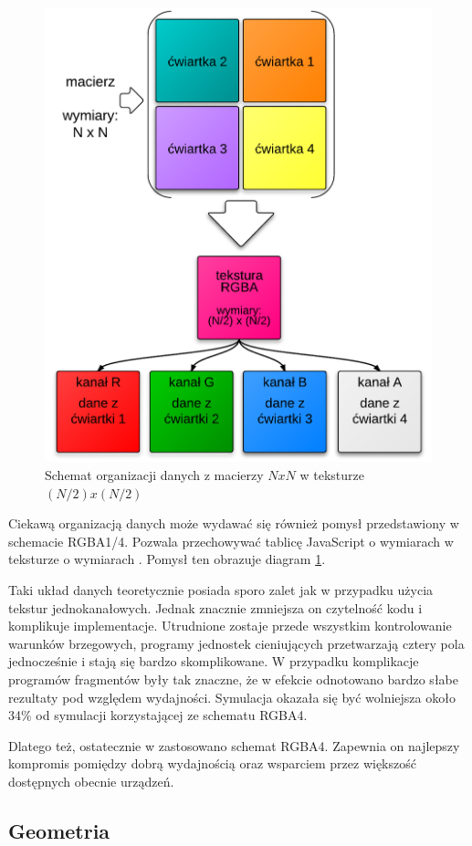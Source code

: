 \begin{figure}[!h]
\centering
\includegraphics[width=.65\textwidth]{img/rgba14Tex}
\caption{Schemat organizacji danych z macierzy $NxN$ w teksturze $(N/2)x(N/2)$}
\label{fig:rgba14Tex}
\end{figure}

Ciekawą organizacją danych może wydawać się również pomysł przedstawiony w
schemacie RGBA1/4. Pozwala przechowywać tablicę JavaScript o wymiarach 
w teksturze o wymiarach . Pomysł ten obrazuje diagram
\ref{fig:rgba14Tex}.

Taki układ danych teoretycznie posiada sporo zalet jak w przypadku użycia
tekstur jednokanałowych. Jednak znacznie zmniejsza on czytelność kodu i
komplikuje implementacje. Utrudnione zostaje przede wszystkim kontrolowanie
warunków brzegowych, programy jednostek cieniujących przetwarzają cztery pola
jednocześnie i stają się bardzo skomplikowane. W przypadku 
komplikacje programów fragmentów były tak znaczne, że w efekcie odnotowano
bardzo słabe rezultaty pod względem wydajności. Symulacja okazała się być
wolniejsza około 34\% od symulacji korzystającej ze schematu RGBA4.

Dlatego też, ostatecznie w  zastosowano schemat RGBA4. Zapewnia on
najlepszy kompromis pomiędzy dobrą wydajnością oraz wsparciem przez większość
dostępnych obecnie urządzeń.

\subsection{Geometria}

